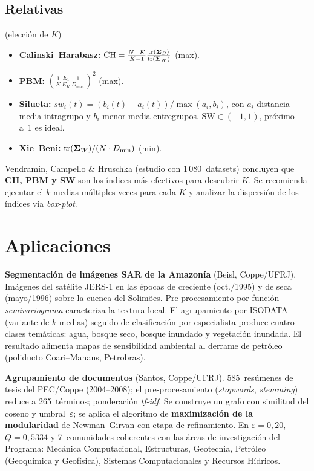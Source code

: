 \subsection{Relativas} (elección de $K$)
\begin{itemize}[leftmargin=1.2cm]
  \item \textbf{Calinski--Harabasz:}
        $\mathrm{CH}=\frac{N-K}{K-1}\frac{\operatorname{tr}(\boldsymbol\Sigma_B)}{\operatorname{tr}(\boldsymbol\Sigma_W)}$ (max).
  \item \textbf{PBM:}
        $(\frac{1}{K}\frac{E_1}{E_K}\frac{1}{D_{\max}})^2$ (max).
  \item \textbf{Silueta:} $sw_i(t)=(b_i(t)-a_i(t))/\max(a_i,b_i)$, con
        $a_i$ distancia media intragrupo y $b_i$ menor media
        entregrupos. $\mathrm{SW}\in(-1,1)$, próximo a~1 es ideal.
  \item \textbf{Xie--Beni:}
        $\operatorname{tr}(\boldsymbol\Sigma_W)/(N\cdot D_{\min})$ (min).
\end{itemize}

Vendramin, Campello \& Hruschka (estudio con 1\,080~datasets) concluyen
que \textbf{CH, PBM y SW} son los índices más efectivos para descubrir
$K$. Se recomienda ejecutar el $k$-medias múltiples veces para cada
$K$ y analizar la dispersión de los índices vía \emph{box-plot}.

\section{Aplicaciones}

\begin{aplicacao}
\textbf{Segmentación de imágenes SAR de la Amazonía} (Beisl,
Coppe/UFRJ). Imágenes del satélite JERS-1 en las épocas de creciente
(oct./1995) y de seca (mayo/1996) sobre la cuenca del Solimões.
Pre-procesamiento por función \emph{semivariograma} caracteriza la
textura local. El agrupamiento por ISODATA (variante de $k$-medias)
seguido de clasificación por especialista produce cuatro clases
temáticas: agua, bosque seco, bosque inundado y vegetación inundada.
El resultado alimenta mapas de sensibilidad ambiental al derrame de
petróleo (poliducto Coari--Manaus, Petrobras).
\end{aplicacao}

\begin{aplicacao}
\textbf{Agrupamiento de documentos} (Santos, Coppe/UFRJ).
585~resúmenes de tesis del PEC/Coppe (2004--2008); el
pre-procesamiento (\emph{stopwords}, \emph{stemming}) reduce a
265~términos; ponderación \emph{tf-idf}. Se construye un grafo con
similitud del coseno y umbral~$\varepsilon$; se aplica el algoritmo de
\textbf{maximización de la modularidad} de Newman--Girvan con etapa de
refinamiento. En $\varepsilon=0{,}20$, $Q=0{,}5334$ y 7~comunidades
coherentes con las áreas de investigación del Programa: Mecánica
Computacional, Estructuras, Geotecnia, Petróleo (Geoquímica y
Geofísica), Sistemas Computacionales y Recursos Hídricos.
\end{aplicacao}


